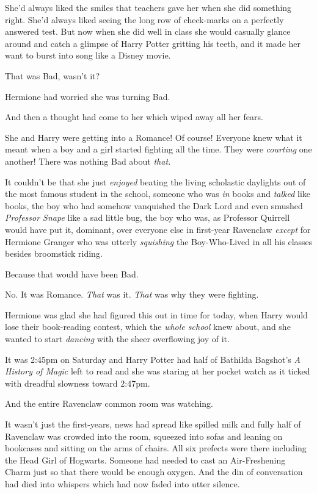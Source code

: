 She'd always liked the smiles that teachers gave her when she did
something right. She'd always liked seeing the long row of check-marks
on a perfectly answered test. But now when she did well in class she
would casually glance around and catch a glimpse of Harry Potter
gritting his teeth, and it made her want to burst into song like a
Disney movie.

That was Bad, wasn't it?

Hermione had worried she was turning Bad.

And then a thought had come to her which wiped away all her fears.

She and Harry were getting into a Romance! Of course! Everyone knew what
it meant when a boy and a girl started fighting all the time. They were
\emph{courting} one another! There was nothing Bad about \emph{that.}

It couldn't be that she just \emph{enjoyed} beating the living
scholastic daylights out of the most famous student in the school,
someone who was \emph{in} books and \emph{talked} like books, the boy
who had somehow vanquished the Dark Lord and even smushed
\emph{Professor Snape} like a sad little bug, the boy who was, as
Professor Quirrell would have put it, dominant, over everyone else in
first-year Ravenclaw \emph{except} for Hermione Granger who was utterly
\emph{squishing} the Boy-Who-Lived in all his classes besides broomstick
riding.

Because that would have been Bad.

No. It was Romance. \emph{That} was it. \emph{That} was why they were
fighting.

Hermione was glad she had figured this out in time for today, when Harry
would lose their book-reading contest, which the \emph{whole school}
knew about, and she wanted to start \emph{dancing} with the sheer
overflowing joy of it.

It was 2:45pm on Saturday and Harry Potter had half of Bathilda
Bagshot's \emph{A History of Magic} left to read and she was staring at
her pocket watch as it ticked with dreadful slowness toward 2:47pm.

And the entire Ravenclaw common room was watching.

It wasn't just the first-years, news had spread like spilled milk and
fully half of Ravenclaw was crowded into the room, squeezed into sofas
and leaning on bookcases and sitting on the arms of chairs. All six
prefects were there including the Head Girl of Hogwarts. Someone had
needed to cast an Air-Freshening Charm just so that there would be
enough oxygen. And the din of conversation had died into whispers which
had now faded into utter silence.

